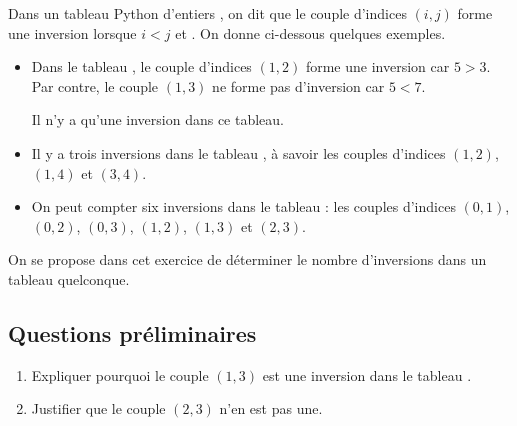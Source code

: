 \documentclass[11pt,a4paper,french,twoside]{PMCours}
\begin{document}
\medskip
Dans un tableau Python d'entiers , on dit que le couple d'indices $(i,j)$ forme une inversion
lorsque $i<j$ et . On donne ci-dessous quelques exemples.
\begin{itemize}
\item Dans le tableau \code{[1, 5, 3, 7]}, le couple d'indices $(1,2)$ forme une inversion car $5 > 3$.
Par contre, le couple $(1,3)$ ne forme pas d'inversion car $5 < 7$.

Il n'y a qu'une inversion dans ce tableau.
\item Il y a trois inversions dans le tableau \code{[1, 6, 2, 7, 3]}, à savoir les couples d'indices
$(1, 2)$, $(1, 4)$ et $(3, 4)$.
\item On peut compter six inversions dans le tableau \code{[7, 6, 5, 3]} : les couples d'indices
$(0, 1)$, $(0, 2)$, $(0, 3)$, $(1, 2)$, $(1, 3)$ et $(2, 3)$.
\end{itemize}
On se propose dans cet exercice de déterminer le nombre d'inversions dans un tableau
quelconque.

\subsection*{Questions préliminaires}
\begin{enumerate}
    \item Expliquer pourquoi le couple $(1, 3)$ est une inversion dans le tableau \code{[4, 8, 3, 7]}.
    \item Justifier que le couple $(2, 3)$ n'en est pas une.
\end{enumerate}
\end{document}
